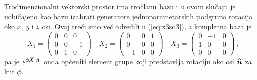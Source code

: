 Trodimenzionalni vektorski prostor ima tročlanu bazu i u ovom slučaju je
uobičajeno kao bazu izabrati generatore jednoparametarskih podgrupa rotacija oko
$x$, $y$ i $z$ osi. Ovaj treći smo već odredili u (\ref{eq:x3so3}), a kompletna
baza je
\begin{equation}
X_1=
\begin{pmatrix}
0 & 0 & 0 \\ 
0 & 0 &-1 \\
0 & 1 & 0
\end{pmatrix}  \quad
X_2=
\begin{pmatrix}
0 & 0 & 1 \\ 
0 & 0 & 0 \\
-1& 0 & 0
\end{pmatrix}  \quad
X_3=
\begin{pmatrix}
0 & -1 & 0 \\ 
1& 0 & 0 \\
0 & 0 & 0
\end{pmatrix} \,,
\label{eq:SO3generators}
\end{equation}
pa je $e^{\phi \vec{X}\cdot\unitn}$ onda općeniti element grupe  koji
predstavlja rotaciju oko osi $\unitn$ za kut $\phi$.

